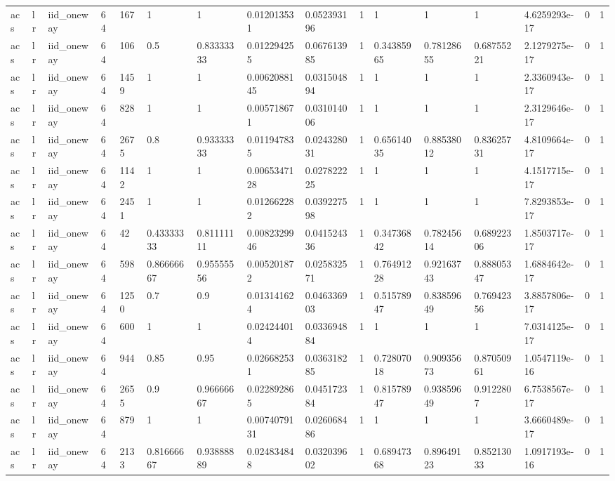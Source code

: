\begin{tabular}{llllllllllllllll}
acs & lr & iid\_oneway & 64 & 167 & 1 & 1 & 0.012013531 & 0.052393196 & 1 & 1 & 1 & 1 & 4.6259293e-17 & 0 & 1 \\
acs & lr & iid\_oneway & 64 & 106 & 0.5 & 0.83333333 & 0.012294255 & 0.067613985 & 1 & 0.34385965 & 0.78128655 & 0.68755221 & 2.1279275e-17 & 0 & 1 \\
acs & lr & iid\_oneway & 64 & 1459 & 1 & 1 & 0.0062088145 & 0.031504894 & 1 & 1 & 1 & 1 & 2.3360943e-17 & 0 & 1 \\
acs & lr & iid\_oneway & 64 & 828 & 1 & 1 & 0.005718671 & 0.031014006 & 1 & 1 & 1 & 1 & 2.3129646e-17 & 0 & 1 \\
acs & lr & iid\_oneway & 64 & 2675 & 0.8 & 0.93333333 & 0.011947835 & 0.024328031 & 1 & 0.65614035 & 0.88538012 & 0.83625731 & 4.8109664e-17 & 0 & 1 \\
acs & lr & iid\_oneway & 64 & 1142 & 1 & 1 & 0.0065347128 & 0.027822225 & 1 & 1 & 1 & 1 & 4.1517715e-17 & 0 & 1 \\
acs & lr & iid\_oneway & 64 & 2451 & 1 & 1 & 0.012662282 & 0.039227598 & 1 & 1 & 1 & 1 & 7.8293853e-17 & 0 & 1 \\
acs & lr & iid\_oneway & 64 & 42 & 0.43333333 & 0.81111111 & 0.0082329946 & 0.041524336 & 1 & 0.34736842 & 0.78245614 & 0.68922306 & 1.8503717e-17 & 0 & 1 \\
acs & lr & iid\_oneway & 64 & 598 & 0.86666667 & 0.95555556 & 0.005201872 & 0.025832571 & 1 & 0.76491228 & 0.92163743 & 0.88805347 & 1.6884642e-17 & 0 & 1 \\
acs & lr & iid\_oneway & 64 & 1250 & 0.7 & 0.9 & 0.013141624 & 0.046336903 & 1 & 0.51578947 & 0.83859649 & 0.76942356 & 3.8857806e-17 & 0 & 1 \\
acs & lr & iid\_oneway & 64 & 600 & 1 & 1 & 0.024244014 & 0.033694884 & 1 & 1 & 1 & 1 & 7.0314125e-17 & 0 & 1 \\
acs & lr & iid\_oneway & 64 & 944 & 0.85 & 0.95 & 0.026682531 & 0.036318285 & 1 & 0.72807018 & 0.90935673 & 0.87050961 & 1.0547119e-16 & 0 & 1 \\
acs & lr & iid\_oneway & 64 & 2655 & 0.9 & 0.96666667 & 0.022892865 & 0.045172384 & 1 & 0.81578947 & 0.93859649 & 0.9122807 & 6.7538567e-17 & 0 & 1 \\
acs & lr & iid\_oneway & 64 & 879 & 1 & 1 & 0.0074079131 & 0.026068486 & 1 & 1 & 1 & 1 & 3.6660489e-17 & 0 & 1 \\
acs & lr & iid\_oneway & 64 & 2133 & 0.81666667 & 0.93888889 & 0.024834848 & 0.032039602 & 1 & 0.68947368 & 0.89649123 & 0.85213033 & 1.0917193e-16 & 0 & 1 \\

\end{tabular}
